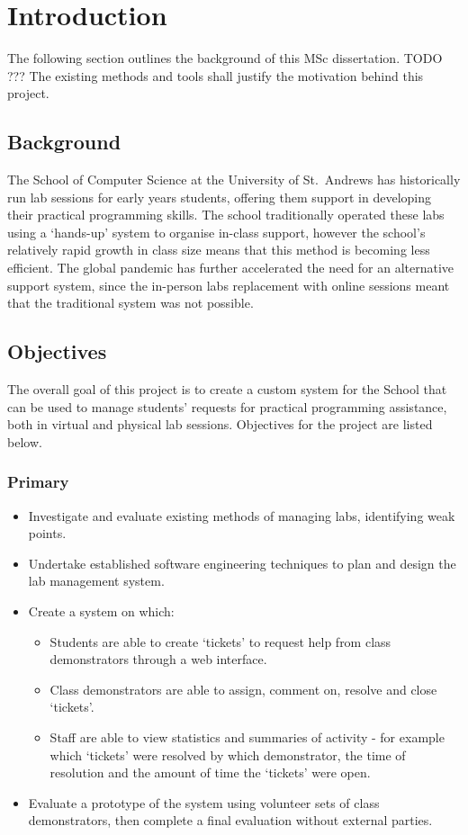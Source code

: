 \chapter{Introduction}
The following section outlines the background of this MSc dissertation. TODO ??? The existing methods and tools shall justify the motivation behind this project. \cite{xue2020data}

\section{Background}

The School of Computer Science at the University of St.\ Andrews has historically run lab sessions for early years students, offering them support in developing their practical programming skills. The school traditionally operated these labs using a ‘hands-up’ system to organise in-class support, however the school's relatively rapid growth in class size means that this method is becoming less efficient. The global pandemic has further accelerated the need for an alternative support system, since the in-person labs replacement with online sessions meant that the traditional system was not possible. 


\section{Objectives}

The overall goal of this project is to create a custom system for the School that can be used to manage students' requests for practical programming assistance, both in virtual and physical lab sessions. Objectives for the project are listed below.

\subsection{Primary}
\begin{itemize}
    \item Investigate and evaluate existing methods of managing labs, identifying weak points.
    \item Undertake established software engineering techniques to plan and design the lab management system.
    \item Create a system on which:
    \begin{itemize}
        \item Students are able to create `tickets' to request help from class demonstrators through a web interface.
        \item Class demonstrators are able to assign, comment on, resolve and close `tickets'.
        \item Staff are able to view statistics and summaries of activity - for example which `tickets' were resolved by which demonstrator, the time of resolution and the amount of time the `tickets' were open.
    \end{itemize}
    \item Evaluate a prototype of the system using volunteer sets of class demonstrators, then complete a final evaluation without external parties. 
    
\end{itemize}

